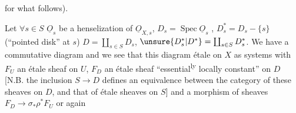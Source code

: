 

for what follows). 

Let $\forall s\in S$ $\underline{O}_s$ be a henselization of $\underline{O}_{X,s}$,
$D_s=\operatorname{Spec}\underline{O}_s$ , $D_s^{*}=D_s-\{s\}$  (``pointed disk'' at
$s$) $D=\coprod_{s\in S}D_s$, $\unsure{D_s^{*}|D^{*}}=\coprod_{s\in S}D_s^{*}$. We have
a commutative diagram
and we see  that this diagram  
  étale on $X$ 
as systems  
with $F_U$ an étale sheaf on $U$, $F_D$ an étale
sheaf ``essential\textsuperscript{ly} locally constant'' on $D$ [N.B. the
inclusion $S\to D$ defines an equivalence
between the category of these sheaves on $D$, and
that of étale sheaves on $S$] and
a morphism of sheaves $F_D\to\sigma_{*}\rho^{*}F_U$ or again


